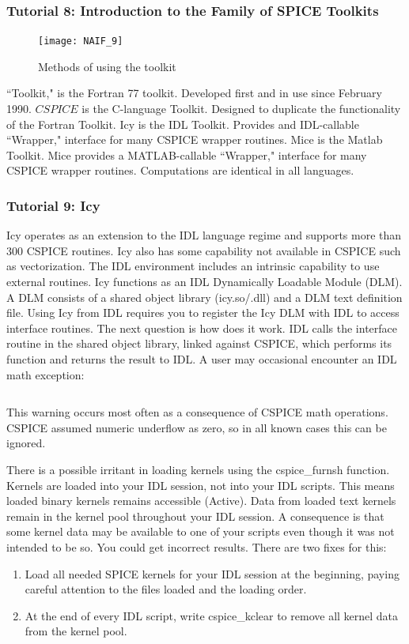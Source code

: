 \documentclass[crop=false,class=book]{standalone}
\begin{document}
\subsubsection{Tutorial 8: Introduction to the Family of SPICE Toolkits}
\begin{figure}[H]
    \centering
    \texttt{[image: NAIF\_9]}
    \caption{Methods of using the toolkit}
    \label{fig:naif_toolkit_and_wrappers}
\end{figure}
``Toolkit," is the Fortran 77 toolkit. Developed first and in use since February 1990. $CSPICE$ is the C-language Toolkit. Designed to duplicate the functionality of the Fortran Toolkit. Icy is the IDL Toolkit. Provides and IDL-callable ``Wrapper," interface for many CSPICE wrapper routines. Mice is the Matlab Toolkit. Mice provides a MATLAB-callable ``Wrapper," interface for many CSPICE wrapper routines. Computations are identical in all languages. 
\subsubsection{Tutorial 9: Icy}
Icy operates as an extension to the IDL language regime and supports more than 300 CSPICE routines. Icy also has some capability not available in CSPICE such as vectorization. The IDL environment includes an intrinsic capability to use external routines. Icy functions as an IDL Dynamically Loadable Module (DLM). A DLM consists of a shared object library (icy.so/.dll) and a DLM text definition file. Using Icy from IDL requires you to register the Icy DLM with IDL to access interface routines. The next question is how does it work. IDL calls the interface routine in the shared object library, linked against CSPICE, which performs its function and returns the result to IDL. A user may occasional encounter an IDL math exception:
\begin{lstlisting}[language=bash,basicstyle=\footnotesize]
% Program caused arithmetic error: Floating underflow
\end{lstlisting}
This warning occurs most often as a consequence of CSPICE math operations. CSPICE assumed numeric underflow as zero, so in all known cases this can be ignored.
\begin{remark}
There is a possible irritant in loading kernels using the cspice\_furnsh function. Kernels are loaded into your IDL session, not into your IDL scripts. This means loaded binary kernels remains accessible (Active). Data from loaded text kernels remain in the kernel pool throughout your IDL session. A consequence is that some kernel data may be available to one of your scripts even though it was not intended to be so. You could get incorrect results. There are two fixes for this:
\begin{enumerate}
    \item Load all needed SPICE kernels for your IDL session at the beginning, paying careful attention to the files loaded and the loading order.
    \item At the end of every IDL script, write cspice\_kclear to remove all kernel data from the kernel pool.
\end{enumerate}
\end{remark}
\end{document}
